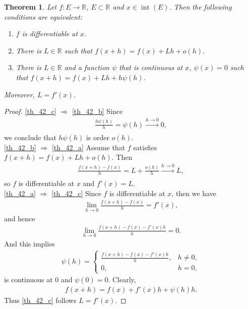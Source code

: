 \documentclass[11pt]{book}
\newtheorem{theorem}{Theorem}[chapter]
\theoremstyle{definition}
\numberwithin{equation}{chapter}
\begin{document}
\begin{theorem}\label{th_42}
Let $f: E \to \mathbb{R}$, $E \subset \mathbb{R}$ and $x \in  \operatorname{int}(E)$. Then the following conditions are equivalent:
\begin{enumerate}[label=(\alph*)]
    \item $f$ is differentiable at $x$. \label{th_42_a}
    
    \item There is $L \in \mathbb{R}$ such that $f(x+h) = f(x) + Lh + o(h)$. \label{th_42_b}
    
    \item There is $L \in \mathbb{R}$ and a function $\psi$ that is continuous at $x$, $\psi(x) = 0$ such that $f(x+h) = f(x) + Lh + h\psi(h)$. \label{th_42_c}
\end{enumerate}
Moreover, $L = f'(x)$.
\end{theorem}
\begin{proof}
\ref{th_42_c} $\Rightarrow$ \ref{th_42_b} Since 
\begin{align*}
    \frac{h \psi(h)}{h} = \psi(h) \xrightarrow[]{h \to 0} 0,
\end{align*}
we conclude that $h\psi(h)$ is order $o(h)$.\\
\ref{th_42_b} $\Rightarrow$ \ref{th_42_a} Assume that $f$ satisfies $f(x+h) = f(x) + Lh + o(h)$. Then 
\begin{align*}
    \frac{f(x+h) - f(x)}{h} = L + \frac{o(h)}{h} \xrightarrow[]{h \to 0} L,
\end{align*}
so $f$ is differentiable at $x$ and $f'(x) = L$.\\
\ref{th_42_a} $\Rightarrow$ \ref{th_42_c} Since $f$ is differentiable at $x$, then we have
\begin{align*}
    \lim_{h\to 0} \frac{f(x+h) - f(x)}{h} = f'(x),
\end{align*}
and hence
\begin{align*}
    \lim_{h\to 0} \frac{f(x+h) - f(x) - f'(x)h}{h} = 0.
\end{align*}
And this implies
\begin{align*}
    \psi(h) = \begin{cases}
        \frac{f(x+h) - f(x) - f'(x)h}{h}, & h \neq 0, \\
        0, & h = 0,
    \end{cases}
\end{align*}
is continuous at $0$ and $\psi(0) = 0$. Clearly,
\begin{align*}
    f(x+h) = f(x) + f'(x)h + \psi(h) h.
\end{align*}
Thus \ref{th_42_c} follows $L = f'(x)$.
\end{proof}
\end{document}
